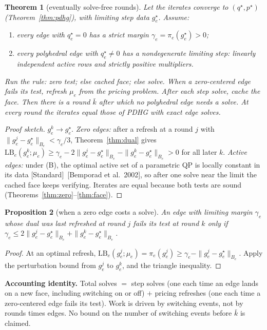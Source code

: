 \documentclass[11pt]{article}
\newcommand{\LB}{\mathrm{LB}}
\newcommand{\std}{\textcolor{muted}{[Standard]}\ }
\theoremstyle{plain}
\newtheorem{theorem}{Theorem}[section]
\newtheorem{proposition}[theorem]{Proposition}
\theoremstyle{definition}
\theoremstyle{remark}
\begin{document}
\begin{theorem}[eventually solve-free rounds]\label{thm:solvefree}
Let the iterates converge to $(q^\star,p^\star)$ (Theorem~\ref{thm:pdhg}), with limiting step data $g_e^\star$. Assume:
\begin{enumerate}[label=(\Alph*),leftmargin=1.6em]
  \item every edge with $q^\star_e=0$ has a strict margin $\gamma_e=\pi_e(g^\star_e)>0$;
  \item every polyhedral edge with $q^\star_e\ne0$ has a nondegenerate limiting step: linearly independent active rows and strictly positive multipliers.
\end{enumerate}
Run the rule: zero test; else cached face; else solve. When a zero-centered edge fails its test, refresh $\mu_e$ from the pricing problem. After each step solve, cache the face. Then there is a round $\bar k$ after which no polyhedral edge needs a solve. At every round the iterates equal those of PDHG with exact edge solves.
\end{theorem}
\begin{proof}[Proof sketch]
$g_e^k\to g_e^\star$. \emph{Zero edges:} after a refresh at a round $j$ with $\|g^j_e-g^\star_e\|_{B_e}<\gamma_e/3$, Theorem~\ref{thm:dual} gives $\LB_e(g^k_e;\mu_e)\ge\gamma_e-2\|g^j_e-g^\star_e\|_{B_e}-\|g^k_e-g^\star_e\|_{B_e}>0$ for all later $k$. \emph{Active edges:} under (B), the optimal active set of a parametric QP is locally constant in its data \std[Bemporad et al.\ 2002], so after one solve near the limit the cached face keeps verifying. Iterates are equal because both tests are sound (Theorems~\ref{thm:zero}--\ref{thm:face}).
\end{proof}

\begin{proposition}[when a zero edge costs a solve]\label{prop:whensolve}
An edge with limiting margin $\gamma_e$ whose dual was last refreshed at round $j$ fails its test at round $k$ only if $\gamma_e\le2\|g^j_e-g^\star_e\|_{B_e}+\|g^k_e-g^\star_e\|_{B_e}$.
\end{proposition}
\begin{proof}
At an optimal refresh, $\LB_e(g^j_e;\mu_e)=\pi_e(g^j_e)\ge\gamma_e-\|g^j_e-g^\star_e\|_{B_e}$. Apply the perturbation bound from $g^j_e$ to $g^k_e$, and the triangle inequality.
\end{proof}
\textbf{Accounting identity.} Total solves $=$ step solves (one each time an edge lands on a new face, including switching on or off) $+$ pricing refreshes (one each time a zero-centered edge fails its test). Work is driven by switching events, not by rounds times edges. No bound on the number of switching events before $\bar k$ is claimed.
\end{document}
